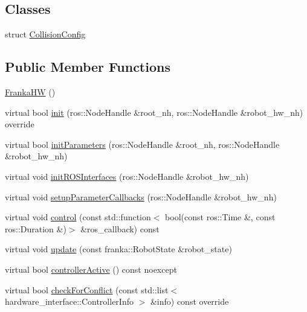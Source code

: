 \subsection*{Classes}
\begin{DoxyCompactItemize}
\item 
struct \hyperlink{structfranka__hw_1_1_franka_h_w_1_1_collision_config}{Collision\+Config}
\end{DoxyCompactItemize}
\subsection*{Public Member Functions}
\begin{DoxyCompactItemize}
\item 
\hyperlink{classfranka__hw_1_1_franka_h_w_abca52ce19bfa28709efcfe8d0d6404b8}{Franka\+HW} ()
\item 
virtual bool \hyperlink{classfranka__hw_1_1_franka_h_w_a0323c9d759de8d6ab8fae4bf574e4a48}{init} (ros\+::\+Node\+Handle \&root\+\_\+nh, ros\+::\+Node\+Handle \&robot\+\_\+hw\+\_\+nh) override
\item 
virtual bool \hyperlink{classfranka__hw_1_1_franka_h_w_a55d479321248ff8bcf80fc73ebb95d16}{init\+Parameters} (ros\+::\+Node\+Handle \&root\+\_\+nh, ros\+::\+Node\+Handle \&robot\+\_\+hw\+\_\+nh)
\item 
virtual void \hyperlink{classfranka__hw_1_1_franka_h_w_ae2775ed9705ec3d1d3e58aea2ce21bde}{init\+R\+O\+S\+Interfaces} (ros\+::\+Node\+Handle \&robot\+\_\+hw\+\_\+nh)
\item 
virtual void \hyperlink{classfranka__hw_1_1_franka_h_w_a064557fa9f0f7cb8e7cfab27eae03eb8}{setup\+Parameter\+Callbacks} (ros\+::\+Node\+Handle \&robot\+\_\+hw\+\_\+nh)
\item 
virtual void \hyperlink{classfranka__hw_1_1_franka_h_w_abbafdee04c749eae1726dd6e76f52c0f}{control} (const std\+::function$<$ bool(const ros\+::\+Time \&, const ros\+::\+Duration \&)$>$ \&ros\+\_\+callback) const
\item 
virtual void \hyperlink{classfranka__hw_1_1_franka_h_w_ad8f348151b93a7eebc9ef45a702a29ee}{update} (const franka\+::\+Robot\+State \&robot\+\_\+state)
\item 
virtual bool \hyperlink{classfranka__hw_1_1_franka_h_w_a8fcc0a82b0c13cdbd1de7fea38c3ecc3}{controller\+Active} () const noexcept
\item 
virtual bool \hyperlink{classfranka__hw_1_1_franka_h_w_a73e581982455acacca51d81e4676e9a6}{check\+For\+Conflict} (const std\+::list$<$ hardware\+\_\+interface\+::\+Controller\+Info $>$ \&info) const override

\end{DoxyCompactItemize}
